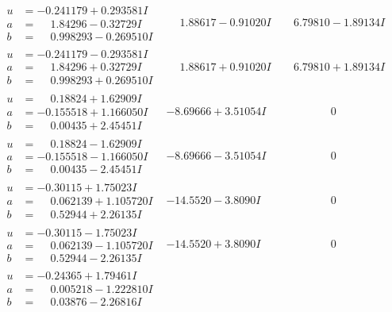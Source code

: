 \documentclass[1p]{elsarticle_modified}
\theoremstyle{definition}
\begin{document}
$$\begin{array}{c|c|c}
\begin{aligned}
u &= -0.241179 + 0.293581 I \\
a &= \phantom{-}1.84296 - 0.32729 I \\
b &= \phantom{-}0.998293 - 0.269510 I\end{aligned}
 & \phantom{-}1.88617 - 0.91020 I & \phantom{-}6.79810 - 1.89134 I \\ \hline\begin{aligned}
u &= -0.241179 - 0.293581 I \\
a &= \phantom{-}1.84296 + 0.32729 I \\
b &= \phantom{-}0.998293 + 0.269510 I\end{aligned}
 & \phantom{-}1.88617 + 0.91020 I & \phantom{-}6.79810 + 1.89134 I \\ \hline\begin{aligned}
u &= \phantom{-}0.18824 + 1.62909 I \\
a &= -0.155518 + 1.166050 I \\
b &= \phantom{-}0.00435 + 2.45451 I\end{aligned}
 & -8.69666 + 3.51054 I & \phantom{-0.000000 } 0 \\ \hline\begin{aligned}
u &= \phantom{-}0.18824 - 1.62909 I \\
a &= -0.155518 - 1.166050 I \\
b &= \phantom{-}0.00435 - 2.45451 I\end{aligned}
 & -8.69666 - 3.51054 I & \phantom{-0.000000 } 0 \\ \hline\begin{aligned}
u &= -0.30115 + 1.75023 I \\
a &= \phantom{-}0.062139 + 1.105720 I \\
b &= \phantom{-}0.52944 + 2.26135 I\end{aligned}
 & -14.5520 - 3.8090 I & \phantom{-0.000000 } 0 \\ \hline\begin{aligned}
u &= -0.30115 - 1.75023 I \\
a &= \phantom{-}0.062139 - 1.105720 I \\
b &= \phantom{-}0.52944 - 2.26135 I\end{aligned}
 & -14.5520 + 3.8090 I & \phantom{-0.000000 } 0 \\ \hline\begin{aligned}
u &= -0.24365 + 1.79461 I \\
a &= \phantom{-}0.005218 - 1.222810 I \\
b &= \phantom{-}0.03876 - 2.26816 I\end{aligned}

\end{array}$$
\end{document}
